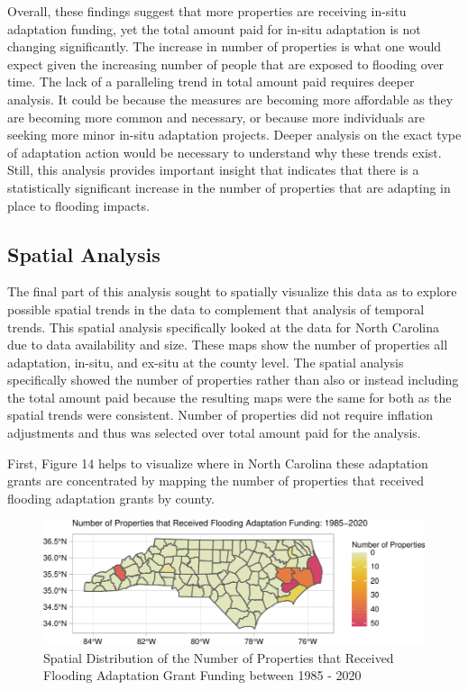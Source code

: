 \documentclass[
  12pt,
]{article}
\begin{document}
Overall, these findings suggest that more properties are receiving
in-situ adaptation funding, yet the total amount paid for in-situ
adaptation is not changing significantly. The increase in number of
properties is what one would expect given the increasing number of
people that are exposed to flooding over time. The lack of a paralleling
trend in total amount paid requires deeper analysis. It could be because
the measures are becoming more affordable as they are becoming more
common and necessary, or because more individuals are seeking more minor
in-situ adaptation projects. Deeper analysis on the exact type of
adaptation action would be necessary to understand why these trends
exist. Still, this analysis provides important insight that indicates
that there is a statistically significant increase in the number of
properties that are adapting in place to flooding impacts.

\hypertarget{spatial-analysis}{%
\subsection{Spatial Analysis}\label{spatial-analysis}}

The final part of this analysis sought to spatially visualize this data
as to explore possible spatial trends in the data to complement that
analysis of temporal trends. This spatial analysis specifically looked
at the data for North Carolina due to data availability and size. These
maps show the number of properties all adaptation, in-situ, and ex-situ
at the county level. The spatial analysis specifically showed the number
of properties rather than also or instead including the total amount
paid because the resulting maps were the same for both as the spatial
trends were consistent. Number of properties did not require inflation
adjustments and thus was selected over total amount paid for the
analysis.

First, Figure 14 helps to visualize where in North Carolina these
adaptation grants are concentrated by mapping the number of properties
that received flooding adaptation grants by county.

\begin{figure}
\centering
\includegraphics{finalreport_files/figure-latex/unnamed-chunk-26-1.pdf}
\caption{Spatial Distribution of the Number of Properties that Received
Flooding Adaptation Grant Funding between 1985 - 2020}
\end{figure}
\end{document}

